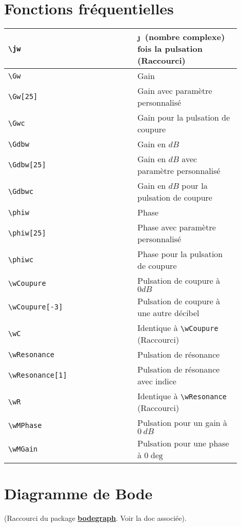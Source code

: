 \documentclass[a4paper,12pt]{article}
\newcommand{\rac}{({\color{red}Raccourci})}
\begin{document}
	
	
	\section{Fonctions fréquentielles}
	\begin{tabular}{|p{0.35\linewidth}|p{0.15\linewidth}|p{0.4\linewidth}|}
		\hline
			\verb!\jw!	&	\jw &	\j\ (nombre complexe) fois la pulsation \rac
		\\\hline
			\verb!\Gw!	&	\Gw &	Gain
		\\\hline
			\verb!\Gw[25]!	&	\Gw[25] &	Gain avec paramètre personnalisé
		\\\hline
			\verb!\Gwc!	&	\Gwc &	Gain pour la pulsation de coupure
		\\\hline
			\verb!\Gdbw!	&	\Gdbw &	Gain en $dB$
		\\\hline
			\verb!\Gdbw[25]!&	\Gdbw[25] &	Gain en $dB$ avec paramètre personnalisé
		\\\hline
			\verb!\Gdbwc!	&	\Gdbwc &	Gain en $dB$ pour la pulsation de coupure
		\\\hline
			\verb!\phiw!	&	\phiw &	Phase
		\\\hline
			\verb!\phiw[25]!	&	\phiw[25] &	Phase avec paramètre personnalisé
		\\\hline
			\verb!\phiwc!	&	\phiwc &	Phase pour la pulsation de coupure
		\\\hline
			\verb!\wCoupure!	&	\wCoupure &	Pulsation de coupure à $0dB$
		\\\hline
			\verb!\wCoupure[-3]!	&	\wCoupure[-3] &	Pulsation de coupure à une autre décibel
		\\\hline
			\verb!\wC!	&	\wC &	Identique à \verb!\wCoupure! \rac
		\\\hline
			\verb!\wResonance!	&	\wResonance &	Pulsation de résonance
		\\\hline
			\verb!\wResonance[1]!	&	\wResonance[1] &	Pulsation de résonance avec indice
		\\\hline
			\verb!\wR!	&	\wR &	Identique à \verb!\wResonance! \rac
		\\\hline
			\verb!\wMPhase!	&	\wMPhase &	Pulsation pour un gain à $0\ dB$
		\\\hline
			\verb!\wMGain!	&	\wMGain &	Pulsation pour une phase à $0\deg$
		\\\hline
	\end{tabular}

	
	\section{Diagramme de Bode}
	(Raccourci du package \href{http://sciences-indus-cpge.papanicola.info/Bode-Black-et-Nyquist-avec-Tikz}{\textbf{bodegraph}}. Voir la doc associée).
\end{document}
